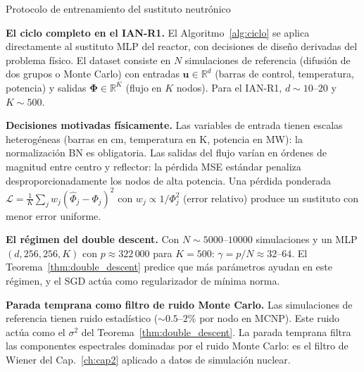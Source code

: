 \begin{estrella}{Protocolo de entrenamiento del sustituto neutrónico}
\label{sec:estrella8}

\textbf{El ciclo completo en el IAN-R1.}
El Algoritmo~\ref{alg:ciclo} se aplica directamente al sustituto MLP
del reactor, con decisiones de diseño derivadas del problema físico. El
dataset consiste en $N$ simulaciones de referencia (difusión de dos
grupos o Monte Carlo) con entradas $\bm{u} \in \mathbb{R}^d$ (barras de
control, temperatura, potencia) y salidas
$\bm{\Phi} \in \mathbb{R}^K$ (flujo en $K$ nodos). Para el IAN-R1,
$d \sim 10$--$20$ y $K \sim 500$.

\textbf{Decisiones motivadas físicamente.}
Las variables de entrada tienen escalas heterogéneas (barras en cm,
temperatura en K, potencia en MW): la normalización BN es obligatoria.
Las salidas del flujo varían en órdenes de magnitud entre centro y
reflector: la pérdida MSE estándar penaliza desproporcionadamente los
nodos de alta potencia. Una pérdida ponderada
$\mathcal{L} = \frac{1}{K}\sum_j w_j(\hat{\Phi}_j-\Phi_j)^2$ con
$w_j \propto 1/\Phi_j^2$ (error relativo) produce un sustituto con
menor error uniforme.

\textbf{El régimen del double descent.}
Con $N \sim 5000$--$10000$ simulaciones y un MLP $(d, 256, 256, K)$ con
$p \approx 322\,000$ para $K = 500$: $\gamma = p/N \approx 32$--$64$.
El Teorema~\ref{thm:double_descent} predice que más parámetros ayudan
en este régimen, y el SGD actúa como regularizador de mínima norma.

\textbf{Parada temprana como filtro de ruido Monte Carlo.}
Las simulaciones de referencia tienen ruido estadístico ($\sim 0.5$--$2\%$
por nodo en MCNP). Este ruido actúa como el $\sigma^2$ del
Teorema~\ref{thm:double_descent}. La parada temprana filtra las
componentes espectrales dominadas por el ruido Monte Carlo: es el filtro
de Wiener del Cap.~\ref{ch:cap2} aplicado a datos de simulación nuclear.
\end{estrella}

\printbibliography[heading=subbibliography]